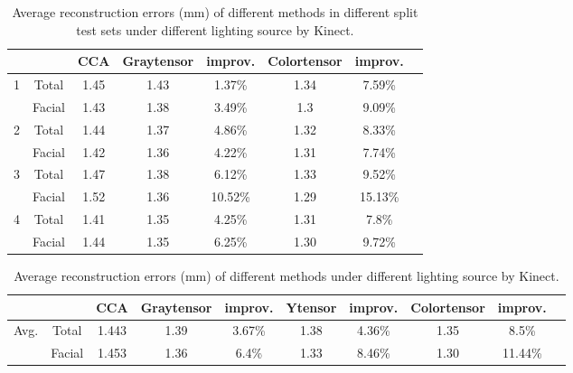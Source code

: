 \begin{table}[htbp]
\centering
\vfill 
\caption{Average reconstruction errors (mm) of different methods in different split test sets under different lighting source by Kinect.}
\label{table:Re2}%
\begin{tabular}[b]{|l||c|c|c|c|c|c|c|}
\hline
 &  & CCA & Graytensor & improv.& Colortensor & improv. \\
\hline
\hline
 1  & Total  & 1.45 & 1.43 & 1.37\% & 1.34 & 7.59\%  \\   
    & Facial & 1.43 & 1.38 & 3.49\% & 1.3 & 9.09\%  \\ 

\hline
 2  & Total  & 1.44 & 1.37 & 4.86\% & 1.32 & 8.33\%  \\   
    & Facial & 1.42 & 1.36 & 4.22\% & 1.31 & 7.74\%  \\ 

\hline
 3  & Total  & 1.47 & 1.38 & 6.12\% & 1.33 & 9.52\%  \\   
    & Facial & 1.52 & 1.36 & 10.52\% & 1.29 & 15.13\%  \\ 

\hline
 4  & Total  & 1.41 & 1.35 & 4.25\% & 1.31 & 7.8\%  \\   
    & Facial & 1.44 & 1.35 & 6.25\% & 1.30 & 9.72\%  \\ 
\hline
\end{tabular}%
\end{table}%

\begin{table}[htbp]
\centering
\vfill 
\caption{Average reconstruction errors (mm) of different methods under different lighting source by Kinect.}
\label{table:Re2_2}%
\begin{tabular}[b]{|l||c|c|c|c|c|c|c|c|c|}

\hline
 &  & CCA & Graytensor & improv.& Ytensor & improv. &Colortensor & improv. \\
\hline
\hline
Avg. & Total  & 1.443 & 1.39 & 3.67\% & 1.38 & 4.36\% & 1.35 & 8.5\%  \\
     & Facial & 1.453 & 1.36 & 6.4\%  & 1.33 & 8.46\% & 1.30 & 11.44\% \\
\hline

\end{tabular}
\end{table}%